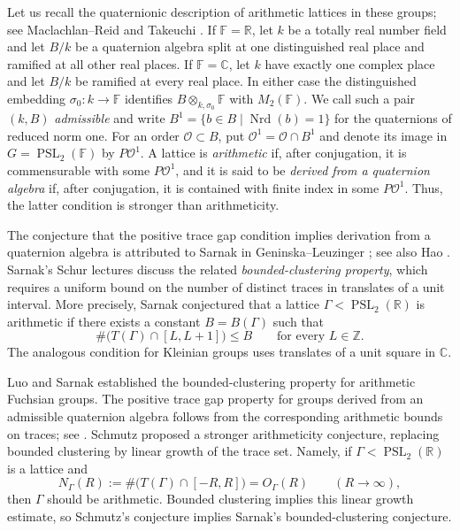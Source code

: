 \documentclass[reqno]{amsart}
\theoremstyle{remark}
\DeclareMathOperator{\Nrd}{Nrd}
\DeclareMathOperator{\PSL}{PSL}
\newcommand{\R}{\mathbb R}
\newcommand{\C}{\mathbb C}
\newcommand{\Z}{\mathbb Z}
\newcommand{\F}{\mathbb F}
\newcommand{\OO}{\mathcal O}
\begin{document}
Let us recall the quaternionic description of arithmetic lattices in these groups; see Maclachlan--Reid \cite{MaclachlanReid} and Takeuchi \cite{Takeuchi}. If $\F=\R$, let $k$ be a totally real number field and let $B/k$ be a quaternion algebra split at one distinguished real place and ramified at all other real places. If $\F=\C$, let $k$ have exactly one complex place and let $B/k$ be ramified at every real place. In either case the distinguished embedding $\sigma_0 : k \to \F$ identifies $B\otimes_{k,\sigma_0}\F$ with $M_2(\F)$. We call such a pair $(k,B)$ {\em admissible} and write $B^1=\{b\in B\mid\Nrd(b)=1\}$ for the quaternions of reduced norm one. For an order $\OO\subset B$, put $\OO^1=\OO\cap B^1$ and denote its image in $G = \PSL_2(\F)$ by $P\OO^1$. A lattice is \emph{arithmetic} if, after conjugation, it is commensurable with some $P\OO^1$, and it is said to be \emph{derived from a quaternion algebra} if, after conjugation, it is contained with finite index in some $P\OO^1$. Thus, the latter condition is stronger than arithmeticity.

The conjecture that the positive trace gap condition implies derivation from a quaternion algebra is attributed to Sarnak in Geninska--Leuzinger \cite[Conjecture 1.4(ii)]{GeninskaLeuzinger}; see also Hao \cite[Conjecture 1.1(2)]{HaoBoundedClustering}. Sarnak's Schur lectures \cite{Sarnak} discuss the related \emph{bounded-clustering property}, which requires a uniform bound on the number of distinct traces in translates of a unit interval. More precisely, Sarnak \cite[footnote on page 211]{Sarnak} conjectured that a lattice
$\Gamma<\PSL_2(\R)$ is arithmetic if there exists a constant
$B=B(\Gamma)$ such that
$$
\#\bigl(T(\Gamma)\cap[L,L+1]\bigr)\le B \qquad\text{for every }L\in\Z.
$$
The analogous condition for Kleinian groups uses translates of a unit square in $\C$.

Luo and Sarnak \cite{LuoSarnak} established the bounded-clustering property for arithmetic Fuchsian groups. The positive trace gap property for groups derived from an admissible quaternion algebra follows from the corresponding arithmetic bounds on traces; see \cite{LuoSarnak,Sarnak}. Schmutz \cite{Schmutz} proposed a stronger arithmeticity conjecture, replacing bounded clustering by linear growth of the trace set. Namely, if $\Gamma<\PSL_2(\R)$ is a lattice and
$$
N_\Gamma(R):=\#\bigl(T(\Gamma)\cap[-R,R]\bigr)=O_\Gamma(R) \qquad (R\to\infty),
$$
then $\Gamma$ should be arithmetic. Bounded clustering implies this linear growth estimate, so Schmutz's conjecture implies Sarnak's bounded-clustering conjecture.
\end{document}

